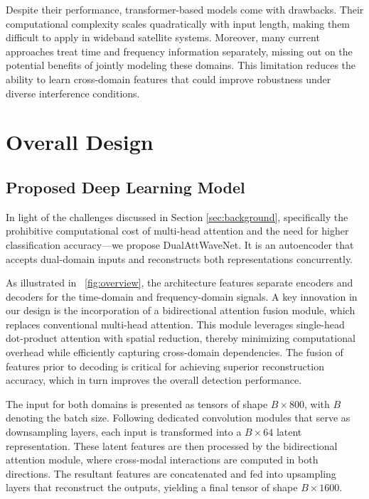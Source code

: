 \documentclass[conference]{IEEEtran}
\begin{document}
Despite their performance, transformer-based models come with drawbacks. Their computational complexity scales quadratically with input length, making them difficult to apply in wideband satellite systems. Moreover, many current approaches treat time and frequency information separately, missing out on the potential benefits of jointly modeling these domains. This limitation reduces the ability to learn cross-domain features that could improve robustness under diverse interference conditions.

\section{Overall Design}
\label{sec:model}

\subsection{Proposed Deep Learning Model}
\label{subsec:proposed_model}

In light of the challenges discussed in Section \ref{sec:background}, specifically the prohibitive computational cost of multi-head attention and the need for higher classification accuracy—we propose DualAttWaveNet. It is an autoencoder that accepts dual-domain inputs and reconstructs both representations concurrently.

As illustrated in \figurename~\ref{fig:overview}, the architecture features separate encoders and decoders for the time-domain and frequency-domain signals. A key innovation in our design is the incorporation of a bidirectional attention fusion module, which replaces conventional multi-head attention. This module leverages single-head dot-product attention with spatial reduction, thereby minimizing computational overhead while efficiently capturing cross-domain dependencies. The fusion of features prior to decoding is critical for achieving superior reconstruction accuracy, which in turn improves the overall detection performance.

The input for both domains is presented as tensors of shape $B \times 800$, with $B$ denoting the batch size. Following dedicated convolution modules that serve as downsampling layers, each input is transformed into a $B \times 64$ latent representation. These latent features are then processed by the bidirectional attention module, where cross-modal interactions are computed in both directions. The resultant features are concatenated and fed into upsampling layers that reconstruct the outputs, yielding a final tensor of shape $B \times 1600$.
\end{document}
